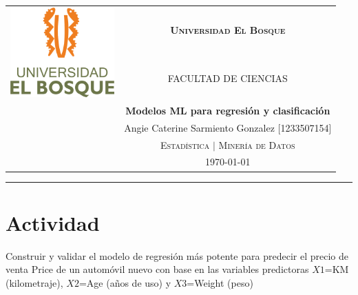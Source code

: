\documentclass[11pt,letterpaper]{article}\usepackage[]{graphicx}\usepackage[]{color}
\newcommand{\colorhrule}[3]{\begingroup\color{#1}\rule{#2}{#3}\endgroup}
\begin{document}
\sloppy     %
\begin{center}
\begin{tabular}{cc}
\multirow{2}{3.5cm}{\includegraphics[width=4cm]{UEBlogo.png}}	& \huge{\textsc{\textbf{Universidad El Bosque}}}\\ %
 & \scriptsize{\textsc{FACULTAD DE CIENCIAS}}\\[5mm]
 & \Large{\textsf{\textbf{Modelos ML para regresión y clasificación}}}\\
 & \small{\textsf{Angie Caterine Sarmiento Gonzalez [1233507154]}}\\ \vspace{5mm}
 & \small{\textsc{Estadística $|$ Minería de Datos}}\\
 & \today\\
\end{tabular}
\end{center}
\begin{center}
\colorhrule{black}{16.5cm}{1.2pt}
\end{center}

\section*{\textbf{Actividad}}

Construir y validar el modelo de regresión más potente para predecir el precio de venta Price de un automóvil nuevo con base en las variables predictoras $X1$=KM (kilometraje), $X2$=Age (años de uso) y $X3$=Weight (peso)
\end{document}
